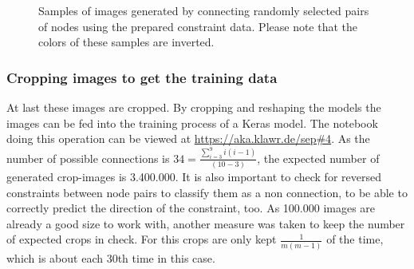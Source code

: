 \begin{figure}
\begin{subfigure}[b]{0.19\textwidth}
    \end{subfigure}
    \begin{subfigure}[b]{0.19\textwidth}
    \end{subfigure}
    \caption{Samples of images generated by connecting randomly selected pairs of nodes using the prepared constraint data. Please note that the colors of these samples are inverted.}
\end{figure}

\subsubsection{Cropping images to get the training data}
\label{ch:cropping_images}

At last these images are cropped.
By cropping and reshaping the models the images can be fed into the training process of a Keras model.
The notebook doing this operation can be viewed at \url{https://aka.klawr.de/sep\#4}.
As the number of possible connections is $34 = \frac{\sum_{i=3}^{9}i(i-1)}{(10-3)}$, the expected number of generated crop-images is 3.400.000.
It is also important to check for reversed constraints between node pairs to classify them as a non connection, to be able to correctly predict the direction of the constraint, too.
As 100.000 images are already a good size to work with, another measure was taken to keep the number of expected crops in check.
For this crops are only kept $\frac{1}{m(m-1)}$ of the time, which is about each 30th time in this case.

